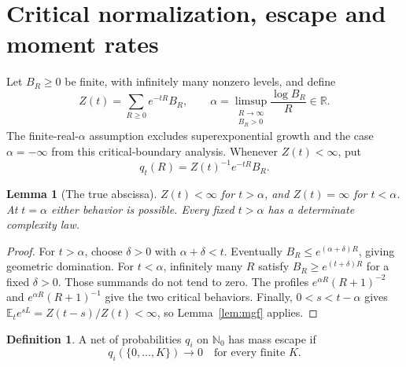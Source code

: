 \documentclass[11pt]{article}
\newtheorem{lemma}[theorem]{Lemma}
\theoremstyle{definition}
\newtheorem{definition}[theorem]{Definition}
\newcommand{\N}{\mathbb N_0}
\newcommand{\R}{\mathbb R}
\newcommand{\E}{\mathbb E}
\begin{document}
\section{Critical normalization, escape and moment rates}
\label{sec:critical}

Let $B_R\geq0$ be finite, with infinitely many nonzero levels, and define
\begin{equation}
 Z(t)=\sum_{R\geq0}e^{-tR}B_R,
 \qquad
 \alpha=\limsup_{\substack{R\to\infty\\B_R>0}}
 \frac{\log B_R}{R}\in\R.
 \label{eq:abscissa}
\end{equation}
The finite-real-$\alpha$ assumption excludes superexponential growth and the case $\alpha=-\infty$ from this critical-boundary analysis.
Whenever $Z(t)<\infty$, put
\begin{equation}
 q_t(R)=Z(t)^{-1}e^{-tR}B_R.
 \label{eq:level-law}
\end{equation}

\begin{lemma}[The true abscissa]
\label{lem:abscissa}
$Z(t)<\infty$ for $t>\alpha$, and $Z(t)=\infty$ for $t<\alpha$.
At $t=\alpha$ either behavior is possible.
Every fixed $t>\alpha$ has a determinate complexity law.
\end{lemma}
\begin{proof}
For $t>\alpha$, choose $\delta>0$ with $\alpha+\delta<t$.
Eventually $B_R\leq e^{(\alpha+\delta)R}$, giving geometric domination.
For $t<\alpha$, infinitely many $R$ satisfy $B_R\geq e^{(t+\delta)R}$ for a fixed $\delta>0$.
Those summands do not tend to zero.
The profiles $e^{\alpha R}(R+1)^{-2}$ and $e^{\alpha R}(R+1)^{-1}$ give the two critical behaviors.
Finally, $0<s<t-\alpha$ gives
$\E_t e^{sL}=Z(t-s)/Z(t)<\infty$, so Lemma~\ref{lem:mgf} applies.
\end{proof}

\begin{definition}
A net of probabilities $q_i$ on $\N$ has mass escape if
\begin{equation}
 q_i(\{0,\ldots,K\})\longrightarrow0
 \quad\text{for every finite }K.
 \label{eq:escape}
\end{equation}
\end{definition}
\end{document}
